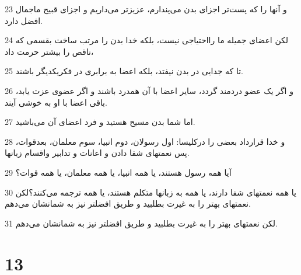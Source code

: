 \par 23 و آنها را که پست‌تر اجزای بدن می‌پندارم، عزیزتر می‌داریم و اجزای قبیح ماجمال افضل دارد.
\par 24 لکن اعضای جمیله ما رااحتیاجی نیست، بلکه خدا بدن را مرتب ساخت بقسمی که ناقص را بیشتر حرمت داد،
\par 25 تا که جدایی در بدن نیفتد، بلکه اعضا به برابری در فکریکدیگر باشند.
\par 26 و اگر یک عضو دردمند گردد، سایر اعضا با آن همدرد باشند و اگر عضوی عزت یابد، باقی اعضا با او به خوشی آیند.
\par 27 اما شما بدن مسیح هستید و فرد اعضای آن می‌باشید.
\par 28 و خدا قرارداد بعضی را درکلیسا: اول رسولان، دوم انبیا، سوم معلمان، بعدقوات، پس نعمتهای شفا دادن و اعانات و تدابیر واقسام زبانها.
\par 29 آیا همه رسول هستند، یا همه انبیا، یا همه معلمان، یا همه قوات؟
\par 30 یا همه نعمتهای شفا دارند، یا همه به زبانها متکلم هستند، یا همه ترجمه می‌کنند؟لکن نعمتهای بهتر را به غیرت بطلبید و طریق افضلتر نیز به شمانشان می‌دهم.
\par 31 لکن نعمتهای بهتر را به غیرت بطلبید و طریق افضلتر نیز به شمانشان می‌دهم.

\chapter{13}

